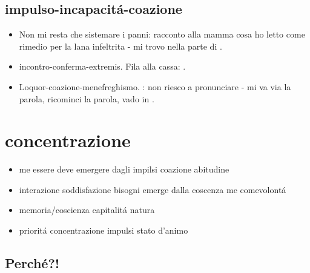\subsection{impulso-incapacit\'a-coazione}

\begin{itemize}

\item Non mi resta che sistemare i panni: racconto alla mamma cosa ho letto come rimedio per la lana infeltrita - mi trovo nella parte di .

\item incontro-conferma-extremis. Fila alla cassa: .

\item Loquor-coazione-menefreghismo. : non riesco a pronunciare - mi va via la parola, ricominci la parola, vado in .

\end{itemize}

\section{concentrazione}

\begin{itemize}

\item me essere deve emergere dagli impilsi coazione abitudine

\item interazione soddisfazione bisogni emerge dalla coscenza me comevolont\'a

\item memoria/coscienza capitalit\'a natura

\item priorit\'a concentrazione impulsi stato d'animo

\end{itemize}

\subsection{Perch\'e?!}

